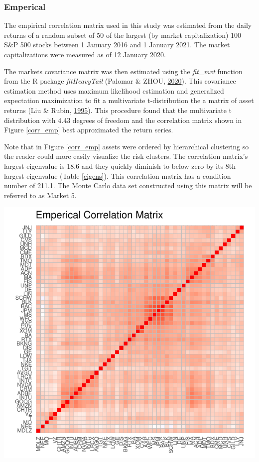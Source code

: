 \documentclass[11pt,preprint, authoryear]{elsarticle}
\let\origfigure\figure
\let\endorigfigure\endfigure
\renewenvironment{figure}[1][2] {
    \expandafter\origfigure\expandafter[H]
} {
    \endorigfigure
}
\numberwithin{equation}{section}
\numberwithin{figure}{section}
\numberwithin{table}{section}
\begin{document}
\hypertarget{emperical}{%
\subsubsection{\texorpdfstring{Emperical
\label{emp}}{Emperical }}\label{emperical}}

The empirical correlation matrix used in this study was estimated from
the daily returns of a random subset of 50 of the largest (by market
capitalization) 100 S\&P 500 stocks between 1 January 2016 and 1 January
2021. The market capitalizations were measured as of 12 January 2020.

The markets covariance matrix was then estimated using the
\emph{fit\_mvt} function from the R package \emph{fitHeavyTail} (Palomar
\& ZHOU, \protect\hyperlink{ref-fitHeavyTail}{2020}). This covariance
estimation method uses maximum likelihood estimation and generalized
expectation maximization to fit a multivariate t-distribution the a
matrix of asset returns (Liu \& Rubin,
\protect\hyperlink{ref-liu1995}{1995}). This procedure found that the
multivariate t distribution with 4.43 degrees of freedom and the
correlation matrix shown in Figure \ref{corr_emp} best approximated the
return series.

Note that in Figure \ref{corr_emp} assets were ordered by hierarchical
clustering so the reader could more easily visualize the risk clusters.
The correlation matrix's largest eigenvalue is 18.6 and they quickly
diminish to below zero by its 8th largest eigenvalue (Table
\ref{eigens}). This correlation matrix has a condition number of 211.1.
The Monte Carlo data set constructed using this matrix will be referred
to as Market 5.

\begin{figure}
\centering
\includegraphics{Thesis_files/figure-latex/unnamed-chunk-1-1.pdf}
\caption{\label{corr_emp} Emperical Correlation Matrix}
\end{figure}
\end{document}

